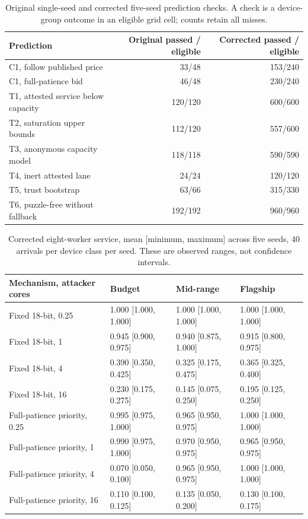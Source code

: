 \documentclass[11pt]{article}
\newcommand{\botrule}{\bottomrule}
\begin{document}
\begin{table}[htbp]
\caption{Original single-seed and corrected five-seed prediction checks. A check is a device-group outcome in an eligible grid cell; counts retain all misses.}
\centering
\small
\begin{tabularx}{\textwidth}{Xrr}
\toprule
Prediction & Original passed / eligible & Corrected passed / eligible \\
\midrule
C1, follow published price & 33/48 & 153/240 \\
C1, full-patience bid & 46/48 & 230/240 \\
T1, attested service below capacity & 120/120 & 600/600 \\
T2, saturation upper bounds & 112/120 & 557/600 \\
T3, anonymous capacity model & 118/118 & 590/590 \\
T4, inert attested lane & 24/24 & 120/120 \\
T5, trust bootstrap & 63/66 & 315/330 \\
T6, puzzle-free without fallback & 192/192 & 960/960 \\
\botrule
\end{tabularx}
\end{table}

\begin{table}[htbp]
\caption{Corrected eight-worker service, mean [minimum, maximum] across five seeds, 40 arrivals per device class per seed. These are observed ranges, not confidence intervals.}
\centering
\small
\begin{tabularx}{\textwidth}{XXXX}
\toprule
Mechanism, attacker cores & Budget & Mid-range & Flagship \\
\midrule
Fixed 18-bit, 0.25 & 1.000 [1.000, 1.000] & 1.000 [1.000, 1.000] & 1.000 [1.000, 1.000] \\
Fixed 18-bit, 1 & 0.945 [0.900, 0.975] & 0.940 [0.875, 1.000] & 0.915 [0.800, 0.975] \\
Fixed 18-bit, 4 & 0.390 [0.350, 0.425] & 0.325 [0.175, 0.475] & 0.365 [0.325, 0.400] \\
Fixed 18-bit, 16 & 0.230 [0.175, 0.275] & 0.145 [0.075, 0.250] & 0.195 [0.125, 0.250] \\
Full-patience priority, 0.25 & 0.995 [0.975, 1.000] & 0.965 [0.950, 0.975] & 1.000 [1.000, 1.000] \\
Full-patience priority, 1 & 0.990 [0.975, 1.000] & 0.970 [0.950, 0.975] & 0.965 [0.950, 0.975] \\
Full-patience priority, 4 & 0.070 [0.050, 0.100] & 0.965 [0.950, 0.975] & 1.000 [1.000, 1.000] \\
Full-patience priority, 16 & 0.110 [0.100, 0.125] & 0.135 [0.050, 0.200] & 0.130 [0.100, 0.175] \\
\botrule
\end{tabularx}
\end{table}
\end{document}
